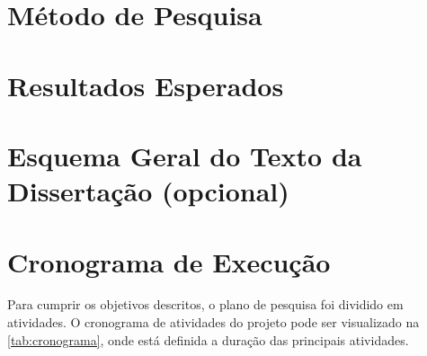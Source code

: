 \documentclass[12pt, a4paper, english, brazil]{article}
\begin{document}
\section{Método de Pesquisa}

\section{Resultados Esperados}

\section{Esquema Geral do Texto da Dissertação (opcional)}

\section{Cronograma de Execução}

Para cumprir os objetivos descritos, o plano de pesquisa foi dividido em atividades. O cronograma de atividades do projeto pode ser visualizado na \autoref{tab:cronograma}, onde está definida a
duração das principais atividades.
\end{document}
